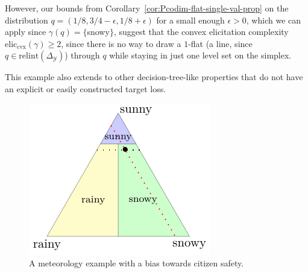 \documentclass[anon,12pt]{colt2021} %
\newcommand{\simplex}{\Delta_\Y}
\newcommand{\relint}[1]{\mathrm{relint}(#1)}
\newcommand{\eliccvx}{\mathrm{elic}_\mathrm{cvx}}
\newcommand{\Y}{\mathcal{Y}}
\begin{document}
However, our bounds from Corollary~\ref{cor:Pcodim-flat-single-val-prop} on the distribution $q = (1/8, 3/4 - \epsilon, 1/8 + \epsilon)$ for a small enough $\epsilon > 0$, which we can apply since $\gamma(q) = \{$snowy$\}$, suggest that the convex elicitation complexity $\eliccvx(\gamma) \geq 2$, since there is no way to draw a $1$-flat (a line, since $q \in \relint{\simplex}$) through $q$ while staying in just one level set on the simplex.


This example also extends to other decision-tree-like properties that do not have an explicit or easily constructed target loss.
\begin{figure}
	\centering
	\includegraphics[width=0.3\linewidth]{tikz/t-example.pdf}
	\caption{A meteorology example with a bias towards citizen safety.}
	\label{fig:t-example}
\end{figure}
\end{document}
